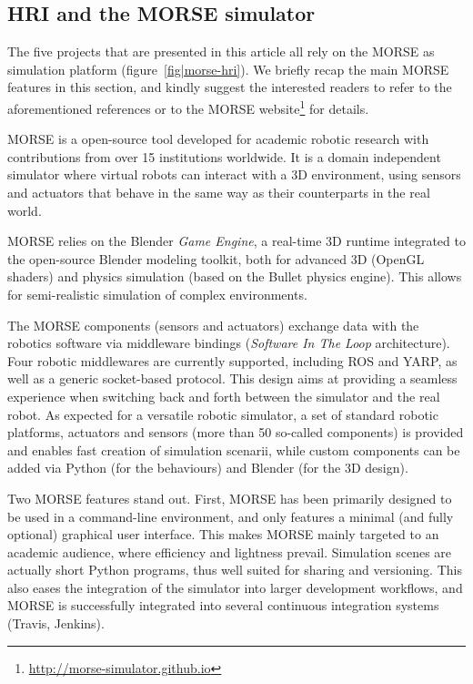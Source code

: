 \documentclass[conference]{IEEEtran}
\begin{document}


\subsection*{HRI and the MORSE simulator}

The five projects that are presented in this article all rely on the MORSE as
simulation platform (figure~\ref{fig|morse-hri}). We briefly recap the main
MORSE features in this section, and kindly suggest the interested readers to
refer to the aforementioned references or to the MORSE
website\footnote{\url{http://morse-simulator.github.io}} for details.

MORSE is a open-source tool developed for academic robotic research with
contributions from over 15 institutions worldwide. It is a domain independent
simulator where virtual robots can interact with a 3D environment, using
sensors and actuators that behave in the same way as their counterparts in the
real world.

MORSE relies on the Blender \emph{Game Engine}, a real-time 3D runtime
integrated to the open-source Blender modeling toolkit, both for advanced 3D
(OpenGL shaders) and physics simulation (based on the {\sc Bullet} physics
engine). This allows for semi-realistic simulation of complex environments.

The MORSE components (sensors and actuators) exchange data with the robotics
software via middleware bindings (\emph{Software In The Loop} architecture).
Four robotic middlewares are currently supported, including ROS and YARP, as
well as a generic socket-based protocol. This design aims at providing a
seamless experience when switching back and forth between the simulator and the
real robot. As expected for a versatile robotic simulator, a set of standard
robotic platforms, actuators and sensors (more than 50 so-called components) is
provided and enables fast creation of simulation scenarii, while custom
components can be added via Python (for the behaviours) and Blender (for the 3D
design).

Two MORSE features stand out. First, MORSE has been primarily designed to be
used in a command-line environment, and only features a minimal (and fully
optional) graphical user interface. This makes MORSE mainly targeted to an
academic audience, where efficiency and lightness prevail.  Simulation scenes
are actually short Python programs, thus well suited for sharing and versioning.
This also eases the integration of the simulator into larger development
workflows, and MORSE is successfully integrated into several continuous
integration systems (Travis, Jenkins).
\end{document}
